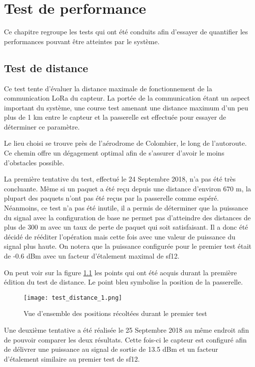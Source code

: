 
\chapter{Test de performance}

Ce chapitre regroupe les tests qui ont été conduits afin d'essayer de quantifier les performances pouvant être atteintes par le système.

\section{Test de distance}\label{ch:test_distance}

Ce test tente d'évaluer la distance maximale de fonctionnement de la communication LoRa du capteur. La portée de la communication étant un aspect important du système, une course test amenant une distance maximum d'un peu plus de 1 km entre le capteur et la passerelle est effectuée pour essayer de déterminer ce paramètre.

Le lieu choisi se trouve près de l'aérodrome de Colombier, le long de l'autoroute. Ce chemin offre un dégagement optimal afin de s'assurer d'avoir le moins d'obstacles possible.

La première tentative du test, effectué le 24 Septembre 2018, n'a pas été très concluante. Même si un paquet a été reçu depuis une distance d'environ 670 m, la plupart des paquets n'ont pas été reçus par la passerelle comme espéré. Néanmoins, ce test n'a pas été inutile, il a permis de déterminer que la puissance du signal avec la configuration de base ne permet pas d'atteindre des distances de plus de 300 m avec un taux de perte de paquet qui soit satisfaisant. Il a donc été décidé de rééditer l'opération mais cette fois avec une valeur de puissance du signal plus haute. On notera que la puissance configurée pour le premier test était de -0.6 dBm avec un facteur d'étalement maximal de sf12.

On peut voir sur la figure \ref{fig:test_distance_11} les points qui ont été acquis durant la première édition du test de distance. Le point bleu symbolise la position de la passerelle.

\begin{figure}[htb]
\centering 
\texttt{[image: test\_distance\_1.png]} 
\caption{Vue d'ensemble des positions récoltées durant le premier test}
\label{fig:test_distance_11}
\end{figure}

Une deuxième tentative a été réalisée le 25 Septembre 2018 au même endroit afin de pouvoir comparer les deux résultats. Cette fois-ci le capteur est configuré afin de délivrer une puissance au signal de sortie de 13.5 dBm et un facteur d'étalement similaire au premier test de sf12.

